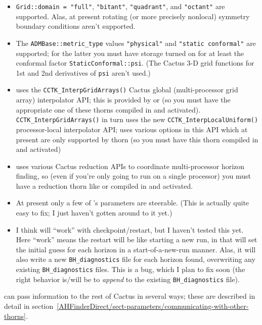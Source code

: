 \begin{itemize}
\item	\verb|Grid::domain = "full"|, \verb|"bitant"|,
	\verb|"quadrant"|, and \verb|"octant"| are supported.
	Alas, at present rotating (or more precisely nonlocal)
	symmetry boundary conditions aren't supported.
\item	The \verb|ADMBase::metric_type| values \verb|"physical"| and
	\verb|"static conformal"| are supported; for the latter you must
	have storage turned on for at least the conformal factor
	\verb|StaticConformal::psi|.  (The Cactus 3-D grid functions
	for 1st and 2nd derivatives of \verb|psi| aren't used.)
\item	{} uses the \verb|CCTK_InterpGridArrays()|
	Cactus global (multi-processor grid array) interpolator API;
	this is provided by  or 
	(so you must have the appropriate one of these thorns compiled
	in and activated).  \verb|CCTK_InterpGridArrays()| in turn uses
	the new \verb|CCTK_InterpLocalUniform()| processor-local
	interpolator API;  uses various options
	in this API which at present are only supported by thorn
	 (so you must have this thorn compiled in
	and activated)
\item	{} uses various Cactus reduction APIs to
	coordinate multi-processor horizon finding, so (even if you're
	only going to run on a single processor) you must have a reduction
	thorn like  or  compiled in
	and activated.
\item	At present only a few of 's parameters
	are steerable.  (This is actually quite easy to fix; I just
	haven't gotten around to it yet.)
\item	I think  will ``work'' with checkpoint/restart,
	but I haven't tested this yet.  Here ``work'' means the restart
	will be like starting a new run, in that 
	will set the initial guess for each horizon in a start-of-a-new-run
	manner.  Alas, it will also write a new \verb|BH_diagnostics| file
	for each horizon found, overwriting any existing \verb|BH_diagnostics|
	files.  This is a bug, which I plan to fix soon (the right behavior
	is/will be to {\em append\/} to the existing \verb|BH_diagnostics|
	file).
\end{itemize}

 can pass information to the rest of Cactus in
several ways; these are described in detail in
section~\ref{AHFinderDirect/sect-parameters/communicating-with-other-thorns}.


